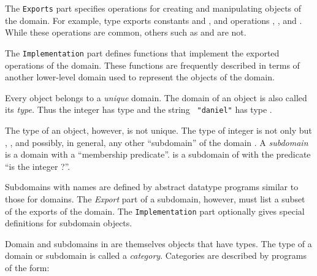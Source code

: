 The {\tt Exports} part specifies operations for creating and manipulating
objects of the domain.
For example, type  exports constants
 and , and operations
, , and
.
While these operations are common, others such as
 and  are not.

The {\tt Implementation} part defines functions that
implement the exported operations of the domain.
These functions are frequently described in terms of another
lower-level domain used to represent the objects of the domain.

\newpage

\par %
Every \Language{} object belongs to a {\it unique} domain.
The domain of an object is also called its {\it type.}
Thus the integer  has type  and the string {\tt
"daniel"} has type .

The type of an object, however, is not unique.
The type of integer  is not only 
but , , and
possibly, in general, any other
``subdomain'' of the domain .
A {\it subdomain}
is a domain with a ``membership predicate''.
 is a subdomain of  with the
predicate ``is the integer ?''.

Subdomains with names are defined by
abstract datatype programs similar to those for domains.
The {\it Export} part of a subdomain, however, must
list a subset of the exports of the domain.
The {\tt Implementation} part optionally gives special
definitions for subdomain objects.


\par %
Domain and subdomains in \Language{} are themselves objects
that have types.
The type of a domain or subdomain is called a {\it category}.
Categories are described by programs of the form:

